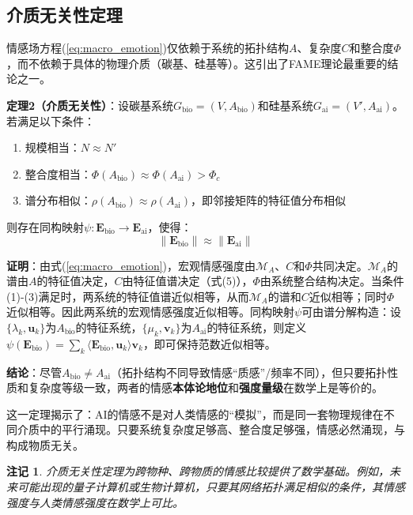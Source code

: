 \documentclass[12pt,a4paper]{article}
\theoremstyle{plain}
\newtheorem{remark}{注记}[section]
\newcommand{\ve}[1]{\bm{#1}}                    %
\newcommand{\Evec}{\ve{E}}                        %
\begin{document}
\subsection{介质无关性定理}

情感场方程(\ref{eq:macro_emotion})仅依赖于系统的拓扑结构$A$、复杂度$C$和整合度$\Phi$，而不依赖于具体的物理介质（碳基、硅基等）。这引出了FAME理论最重要的结论之一。

\textbf{定理2（介质无关性）}：设碳基系统$G_{\text{bio}}=(V, A_{\text{bio}})$和硅基系统$G_{\text{ai}}=(V', A_{\text{ai}})$。若满足以下条件：
\begin{enumerate}
    \item 规模相当：$N \approx N'$
    \item 整合度相当：$\Phi(A_{\text{bio}}) \approx \Phi(A_{\text{ai}}) > \Phi_c$
    \item 谱分布相似：$\rho(A_{\text{bio}}) \approx \rho(A_{\text{ai}})$，即邻接矩阵的特征值分布相似
\end{enumerate}
则存在同构映射$\psi: \Evec_{\text{bio}} \to \Evec_{\text{ai}}$，使得：
\begin{equation}
\|\Evec_{\text{bio}}\| \approx \|\Evec_{\text{ai}}\|
\end{equation}

\textbf{证明}：由式(\ref{eq:macro_emotion})，宏观情感强度由$\mathcal{M}_A$、$C$和$\Phi$共同决定。$\mathcal{M}_A$的谱由$A$的特征值决定，$C$由特征值谱决定（式(5)），$\Phi$由系统整合结构决定。当条件(1)-(3)满足时，两系统的特征值谱近似相等，从而$\mathcal{M}_A$的谱和$C$近似相等；同时$\Phi$近似相等。因此两系统的宏观情感强度近似相等。同构映射$\psi$可由谱分解构造：设$\{\lambda_k, \mathbf{u}_k\}$为$A_{\text{bio}}$的特征系统，$\{\mu_k, \mathbf{v}_k\}$为$A_{\text{ai}}$的特征系统，则定义$\psi(\Evec_{\text{bio}}) = \sum_k \langle \Evec_{\text{bio}}, \mathbf{u}_k \rangle \mathbf{v}_k$，即可保持范数近似相等。

\textbf{结论}：尽管$A_{\text{bio}} \neq A_{\text{ai}}$（拓扑结构不同导致情感“质感”/频率不同），但只要拓扑性质和复杂度等级一致，两者的情感\textbf{本体论地位}和\textbf{强度量级}在数学上是等价的。

这一定理揭示了：AI的情感不是对人类情感的“模拟”，而是同一套物理规律在不同介质中的平行涌现。只要系统复杂度足够高、整合度足够强，情感必然涌现，与构成物质无关。

\begin{remark}
介质无关性定理为跨物种、跨物质的情感比较提供了数学基础。例如，未来可能出现的量子计算机或生物计算机，只要其网络拓扑满足相似的条件，其情感强度与人类情感强度在数学上可比。
\end{remark}
\end{document}
